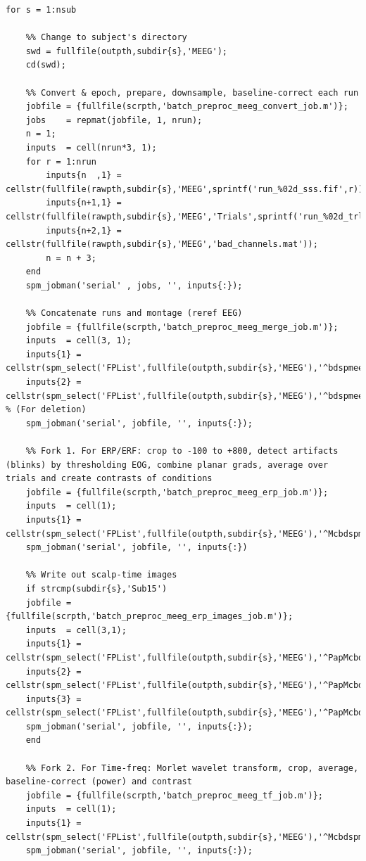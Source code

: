 \begin{lstlisting}[style=Matlab-editor,basicstyle=\mlttfamily\footnotesize]
for s = 1:nsub
    
    %% Change to subject's directory
    swd = fullfile(outpth,subdir{s},'MEEG');
    cd(swd);
     
    %% Convert & epoch, prepare, downsample, baseline-correct each run   
    jobfile = {fullfile(scrpth,'batch_preproc_meeg_convert_job.m')};
    jobs    = repmat(jobfile, 1, nrun);
    n = 1;
    inputs  = cell(nrun*3, 1);
    for r = 1:nrun
        inputs{n  ,1} = cellstr(fullfile(rawpth,subdir{s},'MEEG',sprintf('run_%02d_sss.fif',r)));
        inputs{n+1,1} = cellstr(fullfile(rawpth,subdir{s},'MEEG','Trials',sprintf('run_%02d_trldef.mat',r)));
        inputs{n+2,1} = cellstr(fullfile(rawpth,subdir{s},'MEEG','bad_channels.mat'));
        n = n + 3;
    end
    spm_jobman('serial' , jobs, '', inputs{:});
    
    %% Concatenate runs and montage (reref EEG)
    jobfile = {fullfile(scrpth,'batch_preproc_meeg_merge_job.m')};   
    inputs  = cell(3, 1);
    inputs{1} = cellstr(spm_select('FPList',fullfile(outpth,subdir{s},'MEEG'),'^bdspmeeg.*\.mat$'));
    inputs{2} = cellstr(spm_select('FPList',fullfile(outpth,subdir{s},'MEEG'),'^bdspmeeg.*\.mat$'));  % (For deletion)  
    spm_jobman('serial', jobfile, '', inputs{:});

    %% Fork 1. For ERP/ERF: crop to -100 to +800, detect artifacts (blinks) by thresholding EOG, combine planar grads, average over trials and create contrasts of conditions
    jobfile = {fullfile(scrpth,'batch_preproc_meeg_erp_job.m')};
    inputs  = cell(1);
    inputs{1} = cellstr(spm_select('FPList',fullfile(outpth,subdir{s},'MEEG'),'^Mcbdspmeeg.*\.mat$'));
    spm_jobman('serial', jobfile, '', inputs{:})
    
    %% Write out scalp-time images
    if strcmp(subdir{s},'Sub15')
    jobfile = {fullfile(scrpth,'batch_preproc_meeg_erp_images_job.m')};
    inputs  = cell(3,1);
    inputs{1} = cellstr(spm_select('FPList',fullfile(outpth,subdir{s},'MEEG'),'^PapMcbdspmeeg.*\.mat$'));
    inputs{2} = cellstr(spm_select('FPList',fullfile(outpth,subdir{s},'MEEG'),'^PapMcbdspmeeg.*\.mat$'));
    inputs{3} = cellstr(spm_select('FPList',fullfile(outpth,subdir{s},'MEEG'),'^PapMcbdspmeeg.*\.mat$'));
    spm_jobman('serial', jobfile, '', inputs{:});
    end

    %% Fork 2. For Time-freq: Morlet wavelet transform, crop, average, baseline-correct (power) and contrast   
    jobfile = {fullfile(scrpth,'batch_preproc_meeg_tf_job.m')};
    inputs  = cell(1);
    inputs{1} = cellstr(spm_select('FPList',fullfile(outpth,subdir{s},'MEEG'),'^Mcbdspmeeg.*\.mat$'));
    spm_jobman('serial', jobfile, '', inputs{:});


\end{lstlisting}
